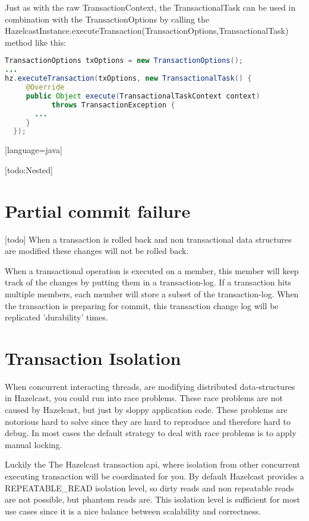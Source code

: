 Just as with the raw TransactionContext, the TransactionalTask can be used in combination with the TransactionOptions by calling the HazelcastInstance.executeTransaction(TransactionOptions,TransactionalTask) method like this:
\begin{lstlisting}[language=java]
TransactionOptions txOptions = new TransactionOptions();
...
hz.executeTransaction(txOptions, new TransactionalTask() {
     @Override
     public Object execute(TransactionalTaskContext context) 
           throws TransactionException {
       ...
     }
  });
\end{lstlisting}[language=java]

[todo:Nested]

\section{Partial commit failure}


[todo]
When a transaction is rolled back and non transactional data structures are modified these changes will not be rolled back.

When a transactional operation is executed on a member, this member will keep track of the changes by putting them in a transaction-log. If a transaction hits multiple members, each member will store a subset of the transaction-log. When the transaction is preparing for commit, this transaction change log will be replicated 'durability' times.


\section{Transaction Isolation}
When concurrent interacting threads, are modifying distributed data-structures in Hazelcast, you could run into race problems. These race problems are not caused by Hazelcast, but just by sloppy application code. These problems are notorious hard to solve since they are hard to reproduce and therefore hard to debug. In most cases the default strategy to deal with race problems is to apply manual locking.

Luckily the The Hazelcast transaction api, where isolation from other concurrent executing transaction will be coordinated for you. By default Hazelcast provides a REPEATABLE\_READ isolation level, so dirty reads and non repeatable reads are not possible, but phantom reads are. This isolation level is sufficient for most use cases since it is a nice balance between scalability and correctness.

